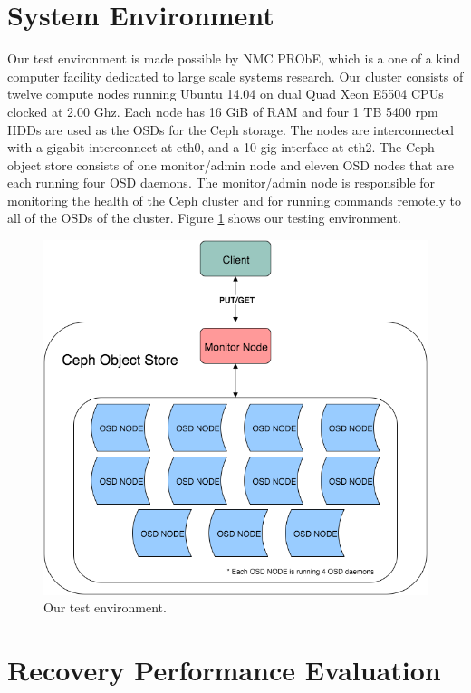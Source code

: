 \documentclass[conference,compsoc]{IEEEtran}
\begin{document}
\section{System Environment}
Our test environment is made possible by NMC PRObE, which is a one of a kind computer facility dedicated to large scale systems research. Our cluster consists of twelve compute nodes running Ubuntu 14.04 on dual Quad Xeon E5504 CPUs clocked at 2.00 Ghz. Each node has 16 GiB of RAM and four 1 TB 5400 rpm HDDs are used as the OSDs for the Ceph storage. The nodes are interconnected with a gigabit interconnect at eth0, and a 10 gig interface at eth2. The Ceph object store consists of one monitor/admin node and eleven OSD nodes that are each running four OSD daemons. The monitor/admin node is responsible for monitoring the health of the Ceph cluster and for running commands remotely to all of the OSDs of the cluster. Figure \ref{fig:Environment} shows our testing environment.

\begin{figure}

\includegraphics[width=\linewidth]{Environment.png}
\caption{Our test environment.}
\label{fig:Environment}

\end{figure}


\section{Recovery Performance Evaluation}
\end{document}

